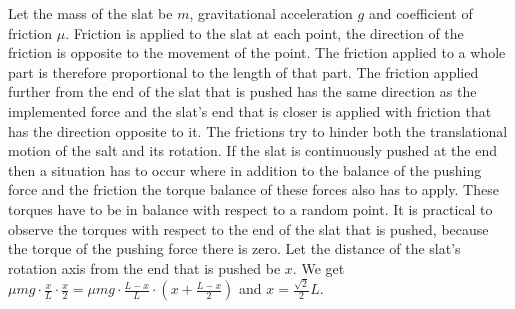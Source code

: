 \solueng
Let the mass of the slat be $m$, gravitational acceleration $g$ and coefficient of friction $\mu$. Friction is applied to the slat at each point, the direction of the friction is opposite to the movement of the point. The friction applied to a whole part is therefore proportional to the length of that part. The friction applied further from the end of the slat that is pushed has the same direction as the implemented force and the slat’s end that is closer is applied with friction that has the direction opposite to it. The frictions try to hinder both the translational motion of the salt and its rotation. If the slat is continuously pushed at the end then a situation has to occur where in addition to the balance of the pushing force and the friction the torque balance of these forces also has to apply. These torques have to be in balance with respect to a random point. It is practical to observe the torques with respect to the end of the slat that is pushed, because the torque of the pushing force there is zero. Let the distance of the slat’s rotation axis from the end that is pushed be $x$. We get $\mu mg \cdot \frac{x}{L} \cdot \frac{x}{2}=\mu mg \cdot \frac{L-x}{L} \cdot \left(x+\frac{L-x}{2}\right)$ and $x=\frac{\sqrt{2}}{2}L$.
\probend